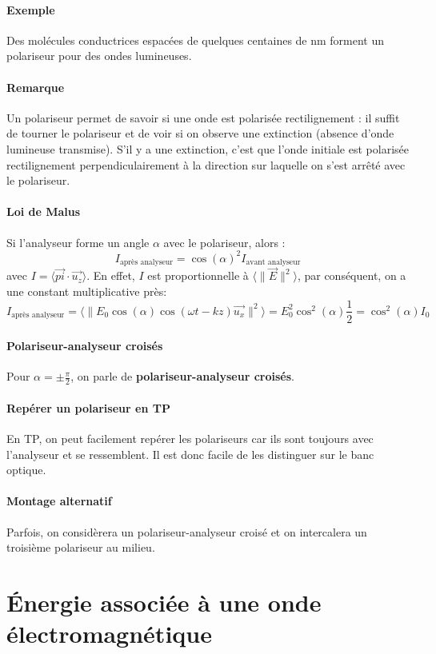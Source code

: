 \documentclass[french]{book}
\theoremstyle{plain}
\theoremstyle{definition}
\theoremstyle{remark}
\begin{document}
\paragraph{Exemple} Des molécules conductrices espacées de quelques centaines de nm forment un polariseur pour des ondes lumineuses.
\paragraph{Remarque} Un polariseur permet de savoir si une onde est polarisée rectilignement : il suffit de tourner le polariseur et de voir si on observe une extinction (absence d'onde lumineuse transmise). S'il y a une extinction, c'est que l'onde initiale est polarisée rectilignement perpendiculairement à la direction sur laquelle on s'est arrêté avec le polariseur.
\paragraph{Loi de Malus} Si l'analyseur forme un angle $\alpha$ avec le polariseur, alors : $$I_\text{après analyseur}=\cos(\alpha)^2I_\text{avant analyseur}$$ avec $I=\langle \overrightarrow{pi}\cdot\overrightarrow{u_z}\rangle$. En effet, $I$ est proportionnelle à $\langle\lVert\overrightarrow{E}\rVert^2\rangle$, par conséquent, on a une constant multiplicative près: $$I_\text{après analyseur}=\langle\lVert E_0\cos(\alpha)\cos(\omega t-kz)\overrightarrow{u_x}\rVert^2\rangle=E_0^2\cos^2(\alpha)\frac{1}{2}=\cos^2(\alpha)I_0$$
\paragraph{Polariseur-analyseur croisés} Pour $\alpha=\displaystyle\pm\frac{\pi}{2}$, on parle de \textbf{polariseur-analyseur croisés}.
\paragraph{Repérer un polariseur en TP} En TP, on peut facilement repérer les polariseurs car ils sont toujours avec l'analyseur et se ressemblent. Il est donc facile de les distinguer sur le banc optique.
\paragraph{Montage alternatif} Parfois, on considèrera un polariseur-analyseur croisé et on intercalera un troisième polariseur au milieu.
\section{Énergie associée à une onde électromagnétique}
\end{document}
